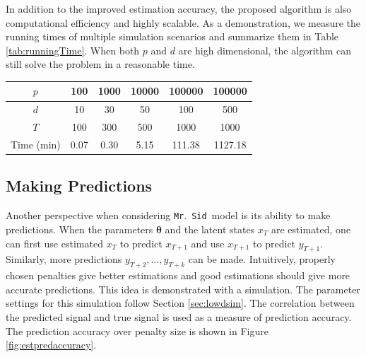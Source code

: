 \documentclass[fleqn]{article}
\let\oldref\ref
\renewcommand{\ref}[1]{(\oldref{#1})}
\newcommand{\mrsid}{{\sc \texttt{Mr}.~\texttt{Sid}}}
\providecommand{\mb}[1]{\boldsymbol{#1}}
\newcommand{\bx}{\mb{x}}
\newcommand{\by}{\mb{y}}
\newcommand{\bX}{\mb{X}}
\newcommand{\bY}{\mb{Y}}
\begin{document}
In addition to the improved estimation accuracy, the proposed algorithm is also computational efficiency and highly scalable. As a demonstration, we measure the running times of multiple simulation scenarios and summarize them in Table \oldref{tab:runningTime}. When both $p$ and $d$ are high dimensional, the algorithm can still solve the problem in a reasonable time.
\begin{center}
\captionof{table}{\mrsid~Running Time}
\label{tab:runningTime}
\begin{tabular}{c|ccccc}
\hline\hline
$p$ & 100 & 1000 & 10000 & 100000 & 100000\\
\hline
$d$ & 10 & 30 & 50 & 100 & 500 \\
\hline
$T$ & 100 & 300 & 500 & 1000 & 1000 \\
\hline
Time (min)& 0.07 & 0.30  & 5.15 & 111.38 & 1127.18 \\
\hline\hline
\end{tabular}
\end{center}
\subsection{Making Predictions}
Another perspective when considering \mrsid~model is its ability to make predictions. When the parameters $\mathbf{\theta}$ and the latent states $x_T$ are estimated, one can first use estimated $x_T$ to predict $x_{T+1}$ and use $x_{T+1}$ to predict $y_{T+1}$. Similarly, more predictions $y_{T+2},\ldots, y_{T+k}$ can be made. Intuitively, properly chosen penalties give better estimations and good estimations should give more accurate predictions. This idea is demonstrated with a simulation. The parameter settings for this simulation follow Section \oldref{sec:lowdsim}. The correlation between the predicted signal and true signal is used as a measure of prediction accuracy. The prediction accuracy over penalty size is shown in Figure \oldref{fig:estpredaccuracy}.


\end{document}
